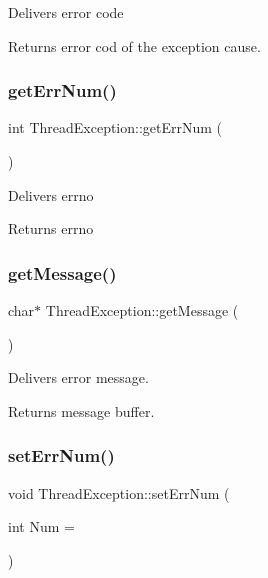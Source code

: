 Delivers error code \begin{DoxyReturn}{Returns}
error cod of the exception cause. 
\end{DoxyReturn}
\mbox{\label{classThreadException_a03564289d24e7d5246bf43fbcae2f7f3}} 
\subsubsection{\texorpdfstring{get\+Err\+Num()}{getErrNum()}}
{\footnotesize\ttfamily int Thread\+Exception\+::get\+Err\+Num (\begin{DoxyParamCaption}{ }\end{DoxyParamCaption})\hspace{0.3cm}{\ttfamily [inline]}}

Delivers errno \begin{DoxyReturn}{Returns}
errno 
\end{DoxyReturn}
\mbox{\label{classThreadException_a49a3a8d894925c4f76b0ec3338354006}} 
\subsubsection{\texorpdfstring{get\+Message()}{getMessage()}}
{\footnotesize\ttfamily char$\ast$ Thread\+Exception\+::get\+Message (\begin{DoxyParamCaption}{ }\end{DoxyParamCaption})\hspace{0.3cm}{\ttfamily [inline]}}

Delivers error message. \begin{DoxyReturn}{Returns}
message buffer. 
\end{DoxyReturn}
\mbox{\label{classThreadException_adaa1940a2b6fa8beff808bee9b9fa2cf}} 
\subsubsection{\texorpdfstring{set\+Err\+Num()}{setErrNum()}}
{\footnotesize\ttfamily void Thread\+Exception\+::set\+Err\+Num (\begin{DoxyParamCaption}\item[{int}]{Num = {} }\end{DoxyParamCaption})\hspace{0.3cm}{\ttfamily [inline]}}

